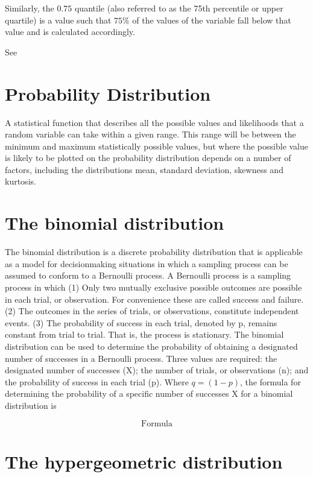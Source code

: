Similarly, the $0.75$ quantile (also referred to as the 75th percentile or upper quartile) is a value such that $75\%$ of the values of the variable fall below that value and is calculated accordingly.

See



\section{Probability Distribution}

A statistical function that describes all the possible values and likelihoods that a random variable can take within a given range. This range will be between the minimum and maximum statistically possible values, but where the possible value is likely to be plotted on the probability distribution depends on a number of factors, including the distributions mean, standard deviation, skewness and kurtosis.



\section {The binomial distribution }

The binomial distribution  is a discrete probability distribution that is applicable as a model for decisionmaking
situations in which a sampling process can be assumed to conform to a Bernoulli process. A Bernoulli
process is a sampling process in which
(1) Only two mutually exclusive possible outcomes are possible in each trial, or observation. For
convenience these are called success and failure.
(2) The outcomes in the series of trials, or observations, constitute independent events.
(3) The probability of success in each trial, denoted by p, remains constant from trial to trial. That is,
the process is stationary.
The binomial distribution can be used to determine the probability of obtaining a designated number of
successes in a Bernoulli process. Three values are required: the designated number of successes (X); the number
of trials, or observations (n); and the probability of success in each trial (p). Where $q = (1 - p)$, the formula for
determining the probability of a specific number of successes X for a binomial distribution is

\[ \mbox{Formula} \]

\section {The hypergeometric distribution }

